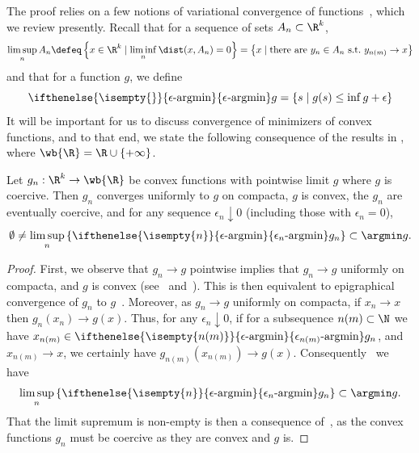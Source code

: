 \documentclass[11pt]{article}
\newcommand{\epsargmin}[1][]{
  \ifthenelse{\isempty{#1}}{%
    \mathop{\epsilon\textup{-argmin}}
  }{%
    \mathop{\epsilon_{#1}\textup{-argmin}}
  }
}
\begin{document}
The proof relies on a few notions of variational convergence of
functions~\citep{RockafellarWe98}, which we review presently.
%
Recall that
for a sequence of sets $A_n \subset \R^k$,
\begin{equation*}
  \limsup_n A_n \defeq \left\{x \in \R^k \mid
  \liminf_n \dist(x, A_n) = 0 \right\}
  = \left\{x \mid \mbox{there~are~} y_n \in A_n
  ~ \mbox{s.t.}~ y_{n(m)} \to x \right\}
\end{equation*}
and that for a function $g$, we define
\begin{equation*}
  \epsargmin g = \left\{s \mid g(s) \le \inf g + \epsilon \right\}
\end{equation*}
It will be important for us to discuss convergence of minimizers of convex
functions, and to that end, we state the following
consequence of the results in \citet{RockafellarWe98},
where $\wb{\R} = \R \cup \{+\infty\}$.
\begin{lemma}
  \label{lemma:epi-convergence}
  Let $g_n : \R^k \to \wb{\R}$ be convex functions with pointwise limit
  $g$ where $g$ is coercive. Then $g_n$ converges uniformly to $g$ on
  compacta, $g$ is convex, the $g_n$ are eventually coercive,
  and for any sequence $\epsilon_n \downarrow 0$
  (including those with $\epsilon_n = 0$),
  \begin{equation*}
    \emptyset \neq
    \limsup_n \left\{\epsargmin[n] g_n\right\}
    \subset \argmin g.
  \end{equation*}
\end{lemma}
\begin{proof}
  First, we observe that $g_n \to g$ pointwise implies that $g_n \to g$
  uniformly on compacta, and $g$ is convex
  (see~\citet[Thm.~IV.3.15]{HiriartUrrutyLe93}
  and~\citet[Thm.~7.17]{RockafellarWe98}). This is then equivalent to
  epigraphical convergence of $g_n$ to
  $g$~\citep[Thm.~7.17]{RockafellarWe98}. Moreover, as $g_n \to g$ uniformly
  on compacta, if $x_n \to x$ then $g_n(x_n) \to g(x)$. Thus,
  for any $\epsilon_n \downarrow 0$, if for a subsequence
  $n(m) \subset \N$ we have $x_{n(m)} \in \epsargmin[n(m)] g_n$,
  and $x_{n(m)} \to x$, we certainly have
  $g_{n(m)}(x_{n(m)}) \to g(x)$.
  Consequently~\citep[Prop.~7.30]{RockafellarWe98} we have
  \begin{equation*}
    \limsup_n \left\{\epsargmin[n] g_n\right\} \subset \argmin g.
  \end{equation*}
  That the limit supremum is non-empty is then a consequence
  of~\citet[Thm.~7.33]{RockafellarWe98}, as the convex functions
  $g_n$ must be coercive as they are convex and $g$ is.
\end{proof}
\end{document}
